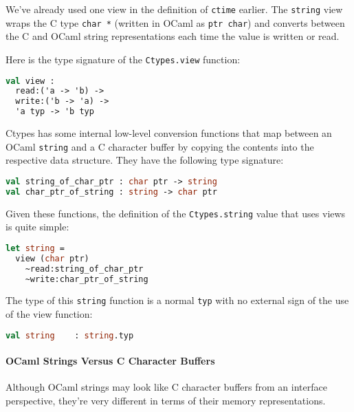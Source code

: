 We've already used one view in the definition of
\passthrough{\lstinline!ctime!} earlier. The
\passthrough{\lstinline!string!} view wraps the C type
\passthrough{\lstinline!char *!} (written in OCaml as
\passthrough{\lstinline!ptr char!}) and converts between the C and OCaml
string representations each time the value is written or read.

Here is the type signature of the \passthrough{\lstinline!Ctypes.view!}
function:

\begin{lstlisting}[language=Caml]
val view :
  read:('a -> 'b) ->
  write:('b -> 'a) ->
  'a typ -> 'b typ
\end{lstlisting}

Ctypes has some internal low-level conversion functions that map between
an OCaml \passthrough{\lstinline!string!} and a C character buffer by
copying the contents into the respective data structure. They have the
following type signature:

\begin{lstlisting}[language=Caml]
val string_of_char_ptr : char ptr -> string
val char_ptr_of_string : string -> char ptr
\end{lstlisting}

Given these functions, the definition of the
\passthrough{\lstinline!Ctypes.string!} value that uses views is quite
simple:

\begin{lstlisting}[language=Caml]
let string =
  view (char ptr)
    ~read:string_of_char_ptr
    ~write:char_ptr_of_string
\end{lstlisting}

The type of this \passthrough{\lstinline!string!} function is a normal
\passthrough{\lstinline!typ!} with no external sign of the use of the
view function:

\begin{lstlisting}[language=Caml]
val string    : string.typ
\end{lstlisting}

\hypertarget{ocaml-strings-versus-c-character-buffers}{%
\paragraph{OCaml Strings Versus C Character
Buffers}\label{ocaml-strings-versus-c-character-buffers}}

Although OCaml strings may look like C character buffers from an
interface perspective, they're very different in terms of their memory
representations.

